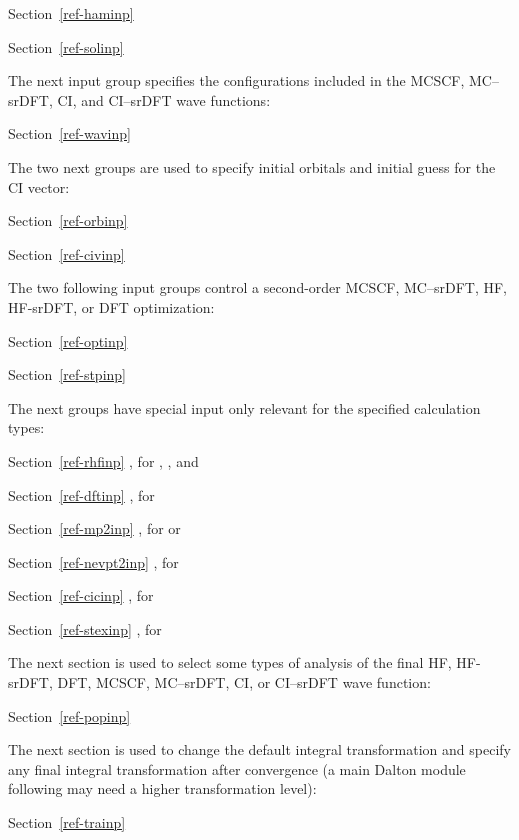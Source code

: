 Section~\ref{ref-haminp} 

Section~\ref{ref-solinp} 
%

\noindent
The next input group specifies the configurations included
in the MCSCF, MC--srDFT, CI, and CI--srDFT wave functions:

Section~\ref{ref-wavinp} 

\noindent
The two next groups are used to specify initial orbitals and initial
guess for the CI vector:

Section~\ref{ref-orbinp} 

Section~\ref{ref-civinp} 

\noindent
The two following input groups control a second-order MCSCF, MC--srDFT, HF, HF-srDFT, or DFT
optimization:

Section~\ref{ref-optinp} 

Section~\ref{ref-stpinp} 

\noindent
The next groups have special input only relevant for the
specified calculation types:

Section~\ref{ref-rhfinp} , for , , and 

Section~\ref{ref-dftinp} , for 

Section~\ref{ref-mp2inp} , for  or 

Section~\ref{ref-nevpt2inp} , for 

Section~\ref{ref-cicinp} , for 

Section~\ref{ref-stexinp} , for 

\noindent
The next section is used to select some types of analysis of the final
HF, HF-srDFT, DFT, MCSCF, MC--srDFT, CI, or CI--srDFT wave function:

Section~\ref{ref-popinp} 

\noindent
The next section is used to change the default integral transformation
and specify any final integral transformation after convergence (a
main Dalton module following {\sir} may need a higher transformation level):

Section~\ref{ref-trainp} 

